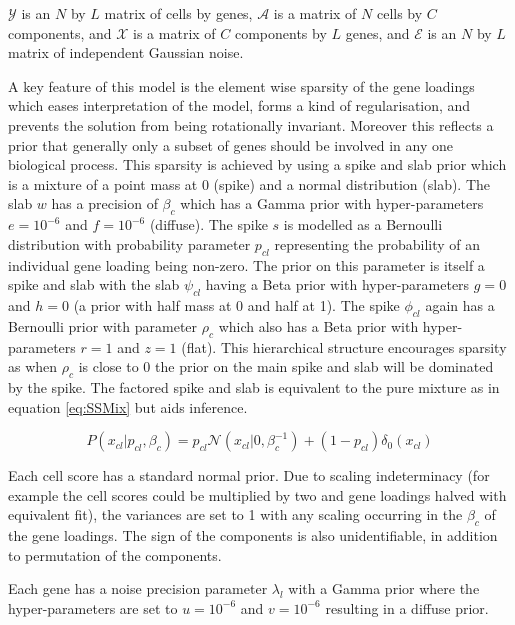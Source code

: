 $\mathcal{Y}$ is an $N$ by $L$ matrix of cells by genes, $\mathcal{A}$ is a matrix of $N$ cells by $C$ components, and $\mathcal{X}$ is a matrix of $C$ components by $L$ genes, and $\mathcal{E}$ is an $N$ by $L$ matrix of independent Gaussian noise.

A key feature of this model is the element wise sparsity of the gene loadings which eases interpretation of the model, forms a kind of regularisation, and prevents the solution from being rotationally invariant.
Moreover this reflects a prior that generally only a subset of genes should be involved in any one biological process.
This sparsity is achieved by using a spike and slab prior which is a mixture of a point mass at 0 (spike) and a normal distribution (slab).
The slab $w$ has a precision of $\beta_{c}$ which has a Gamma prior with hyper-parameters $e = 10^{-6}$ and $f = 10^{-6}$ (diffuse).
The spike $s$ is modelled as a Bernoulli distribution with probability parameter $p_{cl}$ representing the probability of an individual gene loading being non-zero.
The prior on this parameter is itself a spike and slab with the slab $\psi_{c l}$ having a Beta prior with hyper-parameters $g=0$ and $h=0$ (a prior with half mass at 0 and half at 1).
The spike $\phi_{c l}$ again has a Bernoulli prior with parameter $\rho_{c}$ which also has a Beta prior with hyper-parameters $r=1$ and $z=1$ (flat).
This hierarchical structure encourages sparsity as when $\rho_{c}$ is close to 0 the prior on the main spike and slab will be dominated by the spike.
The factored spike and slab is equivalent to the pure mixture as in equation \ref{eq:SSMix} but aids inference.

\begin{equation}
P\left(x_{c l} | p_{c l}, \beta_{c}\right)=p_{c l} \mathcal{N}\left(x_{c l} | 0, \beta_{c}^{-1}\right)+\left(1-p_{c l}\right) \delta_{0}\left(x_{c l}\right)
\label{eq:SSMix}
\end{equation}

Each cell score has a standard normal prior.
Due to scaling indeterminacy (for example the cell scores could be multiplied by two and gene loadings halved with equivalent fit), the variances are set to 1 with any scaling occurring in the $\beta_{c}$ of the gene loadings.
The sign of the components is also unidentifiable, in addition to permutation of the components.

Each gene has a noise precision parameter $\lambda_{l}$ with a Gamma prior where the hyper-parameters are set to $u = 10^{-6}$ and $v = 10^{-6}$ resulting in a diffuse prior. 


